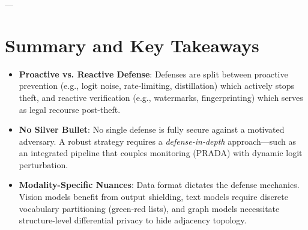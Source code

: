 \documentclass{article}
\begin{document}
---

\section{Summary and Key Takeaways}
\begin{itemize}
    \item \textbf{Proactive vs. Reactive Defense}: Defenses are split between proactive prevention (e.g., logit noise, rate-limiting, distillation) which actively stops theft, and reactive verification (e.g., watermarks, fingerprinting) which serves as legal recourse post-theft.
    \item \textbf{No Silver Bullet}: No single defense is fully secure against a motivated adversary. A robust strategy requires a \textit{defense-in-depth} approach---such as an integrated pipeline that couples monitoring (PRADA) with dynamic logit perturbation.
    \item \textbf{Modality-Specific Nuances}: Data format dictates the defense mechanics. Vision models benefit from output shielding, text models require discrete vocabulary partitioning (green-red lists), and graph models necessitate structure-level differential privacy to hide adjacency topology.
\end{itemize}
\end{document}
